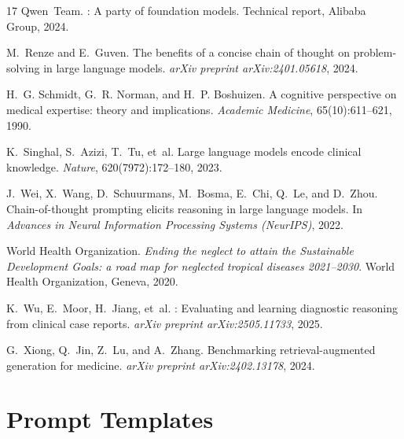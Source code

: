 \documentclass{article}
\begin{document}
\begin{thebibliography}{17}
Qwen~Team.
: A party of foundation models.
\newblock Technical report, Alibaba Group, 2024.

M.~Renze and E.~Guven.
\newblock The benefits of a concise chain of thought on problem-solving in large language models.
\newblock \emph{arXiv preprint arXiv:2401.05618}, 2024.

H.~G. Schmidt, G.~R. Norman, and H.~P. Boshuizen.
\newblock A cognitive perspective on medical expertise: theory and implications.
\newblock \emph{Academic Medicine}, 65(10):611--621, 1990.

K.~Singhal, S.~Azizi, T.~Tu, et~al.
\newblock Large language models encode clinical knowledge.
\newblock \emph{Nature}, 620(7972):172--180, 2023.

J.~Wei, X.~Wang, D.~Schuurmans, M.~Bosma, E.~Chi, Q.~Le, and D.~Zhou.
\newblock Chain-of-thought prompting elicits reasoning in large language models.
\newblock In \emph{Advances in Neural Information Processing Systems (NeurIPS)}, 2022.

World Health Organization.
\newblock \emph{Ending the neglect to attain the Sustainable Development Goals: a road map for neglected tropical diseases 2021--2030}.
\newblock World Health Organization, Geneva, 2020.

K.~Wu, E.~Moor, H.~Jiang, et~al.
: Evaluating and learning diagnostic reasoning from clinical case reports.
\newblock \emph{arXiv preprint arXiv:2505.11733}, 2025.

G.~Xiong, Q.~Jin, Z.~Lu, and A.~Zhang.
\newblock Benchmarking retrieval-augmented generation for medicine.
\newblock \emph{arXiv preprint arXiv:2402.13178}, 2024.

\end{thebibliography}

\newpage
\appendix
\section{Prompt Templates}
\label{app:prompts}
\end{document}
